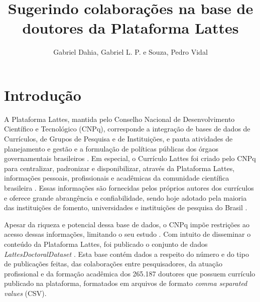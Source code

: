 \documentclass[12pt]{article}
\title{Sugerindo colaborações na base de doutores da Plataforma Lattes}
\author{Gabriel Dahia, Gabriel L. P. e Souza, Pedro Vidal}
\begin{document}
 

\maketitle

     


\section{Introdução}

A Plataforma Lattes, mantida pelo Conselho Nacional de Desenvolvimento Científico e Tecnológico (CNPq), corresponde a integração de bases de dados de Currículos, de Grupos de Pesquisa e de Instituições, e pauta atividades de planejamento e gestão e a formulação de políticas públicas dos órgaos governamentais brasileiros \cite{lattes-cnpq}.
Em especial, o Currículo Lattes foi criado pelo CNPq para centralizar, padronizar e disponibilizar, através da Plataforma Lattes, informações pessoais, profissionais e acadêmicas da comunidade científica brasileira \cite{sucupira}.
Essas informações são fornecidas pelos próprios autores dos currículos \cite{sucupira} e oferece grande abrangência e confiabilidade, sendo hoje adotado pela maioria das instituições de fomento, universidades e instituições de pesquisa do Brasil \cite{lattes-cnpq}.

Apesar da riqueza e potencial dessa base de dados, o CNPq impõe restrições ao acesso dessas informações, limitando o seu estudo \cite{lattes-dataset}.
Com intuito de disseminar o conteúdo da Plataforma Lattes, foi publicado o conjunto de dados \emph{LattesDoctoralDataset} \cite{lattes-dataset}.
Esta base contém dados a respeito do número e do tipo de publicações feitas, das colaborações entre pesquisadores, da atuação profissional e da formação acadêmica dos 265.187 doutores que possuem currículo publicado na plataforma, formatados em arquivos de formato \textit{comma separated values} (CSV).
\end{document}
